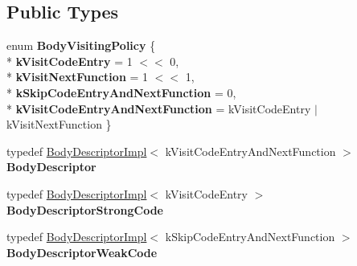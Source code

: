 \subsection*{Public Types}
\begin{DoxyCompactItemize}
\item 
enum {\bfseries Body\+Visiting\+Policy} \{ \\*
{\bfseries k\+Visit\+Code\+Entry} = 1 $<$$<$ 0, 
\\*
{\bfseries k\+Visit\+Next\+Function} = 1 $<$$<$ 1, 
\\*
{\bfseries k\+Skip\+Code\+Entry\+And\+Next\+Function} = 0, 
\\*
{\bfseries k\+Visit\+Code\+Entry\+And\+Next\+Function} = k\+Visit\+Code\+Entry $\vert$ k\+Visit\+Next\+Function
 \}\hypertarget{classv8_1_1internal_1_1_j_s_function_a578e0fa5210aec4ce868b15de87d9624}{}\label{classv8_1_1internal_1_1_j_s_function_a578e0fa5210aec4ce868b15de87d9624}

\item 
typedef \hyperlink{classv8_1_1internal_1_1_j_s_function_1_1_body_descriptor_impl}{Body\+Descriptor\+Impl}$<$ k\+Visit\+Code\+Entry\+And\+Next\+Function $>$ {\bfseries Body\+Descriptor}\hypertarget{classv8_1_1internal_1_1_j_s_function_a4f916baea93483f109fcd6eec0dae064}{}\label{classv8_1_1internal_1_1_j_s_function_a4f916baea93483f109fcd6eec0dae064}

\item 
typedef \hyperlink{classv8_1_1internal_1_1_j_s_function_1_1_body_descriptor_impl}{Body\+Descriptor\+Impl}$<$ k\+Visit\+Code\+Entry $>$ {\bfseries Body\+Descriptor\+Strong\+Code}\hypertarget{classv8_1_1internal_1_1_j_s_function_a47b44d535021ff4a6a5ec6172a2bd5a2}{}\label{classv8_1_1internal_1_1_j_s_function_a47b44d535021ff4a6a5ec6172a2bd5a2}

\item 
typedef \hyperlink{classv8_1_1internal_1_1_j_s_function_1_1_body_descriptor_impl}{Body\+Descriptor\+Impl}$<$ k\+Skip\+Code\+Entry\+And\+Next\+Function $>$ {\bfseries Body\+Descriptor\+Weak\+Code}\hypertarget{classv8_1_1internal_1_1_j_s_function_a6376754906ad53f1fcdaed58e7f19573}{}\label{classv8_1_1internal_1_1_j_s_function_a6376754906ad53f1fcdaed58e7f19573}

\end{DoxyCompactItemize}
